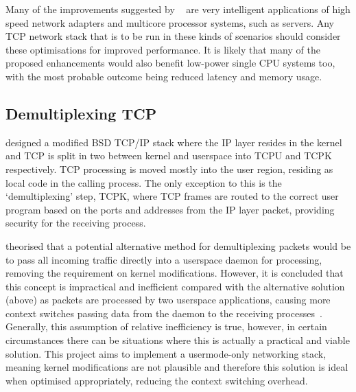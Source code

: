 \documentclass[11pt,a4paper,british]{bhamarticle}
\begin{document}
\begin{multicols}{2}
Many of the improvements suggested by \citeauthor{jeong2014mtcp}~\cite{jeong2014mtcp} are very intelligent applications of high speed network adapters and multicore processor systems, such as servers. Any TCP network stack that is to be run in these kinds of scenarios should consider these optimisations for improved performance. It is likely that many of the proposed enhancements would also benefit low-power single CPU systems too, with the most probable outcome being reduced latency and memory usage.

\subsection{Demultiplexing TCP}
\citeauthor{braun:inria-00074040} designed a modified BSD TCP/IP stack where the IP layer resides in the kernel and TCP is split in two between kernel and userspace into TCPU and TCPK respectively. TCP processing is moved mostly into the user region, residing as local code in the calling process. The only exception to this is the `demultiplexing' step, TCPK, where TCP frames are routed to the correct user program based on the ports and addresses from the IP layer packet, providing security for the receiving process.

\citeauthor{braun:inria-00074040} theorised that a potential alternative method for demultiplexing packets would be to pass all incoming traffic directly into a userspace daemon for processing, removing the requirement on kernel modifications. However, it is concluded that this concept is impractical and inefficient compared with the alternative solution (above) as packets are processed by two userspace applications, causing more context switches passing data from the daemon to the receiving processes~\cite[2.1]{braun:inria-00074040}\cite[3]{edwards1995experiences}. Generally, this assumption of relative inefficiency is true, however, in certain circumstances there can be situations where this is actually a practical and viable solution. This project aims to implement a usermode-only networking stack, meaning kernel modifications are not plausible and therefore this solution is ideal when optimised appropriately, reducing the context switching overhead.


\end{multicols}
\end{document}
